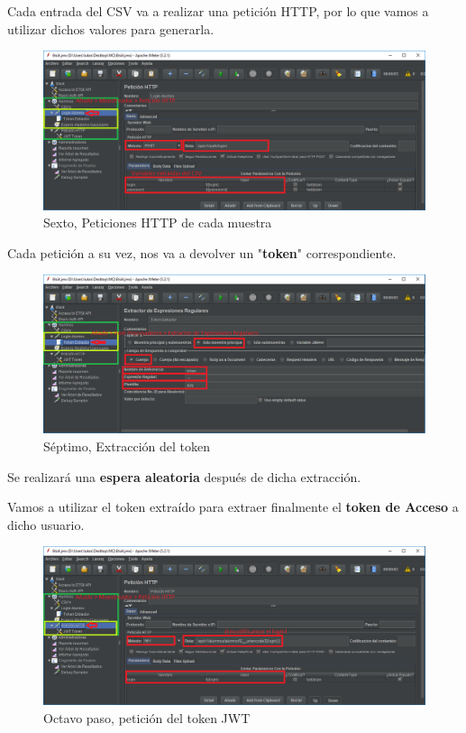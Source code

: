\documentclass[12pt,a4paper]{article}
\begin{document}
	Cada entrada del CSV va a realizar una petición HTTP, por lo que vamos a utilizar dichos valores para generarla.

	\begin{figure}[h]
		\centering
		\includegraphics[width=1.0\textwidth]{images/step-6.png}
		\caption{Sexto, Peticiones HTTP de cada muestra}
	\end{figure}

	\newpage
	
	Cada petición a su vez, nos va a devolver un "\textbf{token}" correspondiente.
	
	\begin{figure}[h]
		\centering
		\includegraphics[width=1.0\textwidth]{images/step-7.png}
		\caption{Séptimo, Extracción del token}
	\end{figure}

	Se realizará una \textbf{espera aleatoria} después de dicha extracción.

	Vamos a utilizar el token extraído para extraer finalmente el \textbf{token de Acceso} a dicho usuario.

	\begin{figure}[h]
		\centering
		\includegraphics[width=1.0\textwidth]{images/step-8.png}
		\caption{Octavo paso, petición del token JWT}
	\end{figure}
\end{document}
